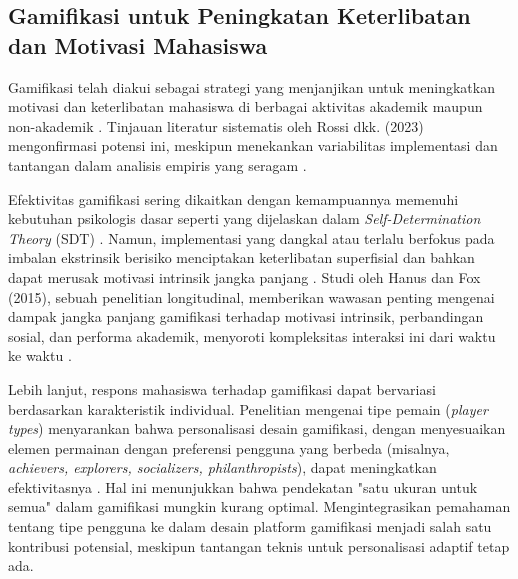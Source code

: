 \subsection{Gamifikasi untuk Peningkatan Keterlibatan dan Motivasi Mahasiswa}
\label{subsec:gamifikasi_engagement_tinjauan_revised}

Gamifikasi telah diakui sebagai strategi yang menjanjikan untuk meningkatkan motivasi dan keterlibatan mahasiswa di berbagai aktivitas akademik maupun non-akademik \cite{gamification_motivation_engagement_chemistry_2021, gamification_in_education_boosting_2025}. Tinjauan literatur sistematis oleh Rossi dkk. (2023) mengonfirmasi potensi ini, meskipun menekankan variabilitas implementasi dan tantangan dalam analisis empiris yang seragam \cite{gamification_higher_ed_review_2023}.

Efektivitas gamifikasi sering dikaitkan dengan kemampuannya memenuhi kebutuhan psikologis dasar seperti yang dijelaskan dalam \textit{Self-Determination Theory} (SDT) \cite{sdt_gamification_review_2015, sdt_gamification_duolingo_2025}. Namun, implementasi yang dangkal atau terlalu berfokus pada imbalan ekstrinsik berisiko menciptakan keterlibatan superfisial dan bahkan dapat merusak motivasi intrinsik jangka panjang \cite{challenges_gamification_higher_ed_2022}. Studi oleh Hanus dan Fox (2015), sebuah penelitian longitudinal, memberikan wawasan penting mengenai dampak jangka panjang gamifikasi terhadap motivasi intrinsik, perbandingan sosial, dan performa akademik, menyoroti kompleksitas interaksi ini dari waktu ke waktu \cite{hanus_longitudinal_gamification_2015}.

Lebih lanjut, respons mahasiswa terhadap gamifikasi dapat bervariasi berdasarkan karakteristik individual. Penelitian mengenai tipe pemain (\textit{player types}) menyarankan bahwa personalisasi desain gamifikasi, dengan menyesuaikan elemen permainan dengan preferensi pengguna yang berbeda (misalnya, \textit{achievers, explorers, socializers, philanthropists}), dapat meningkatkan efektivitasnya \cite{taskin_player_types_gamification_2022}. Hal ini menunjukkan bahwa pendekatan "satu ukuran untuk semua" dalam gamifikasi mungkin kurang optimal. Mengintegrasikan pemahaman tentang tipe pengguna ke dalam desain platform gamifikasi menjadi salah satu kontribusi potensial, meskipun tantangan teknis untuk personalisasi adaptif tetap ada.

